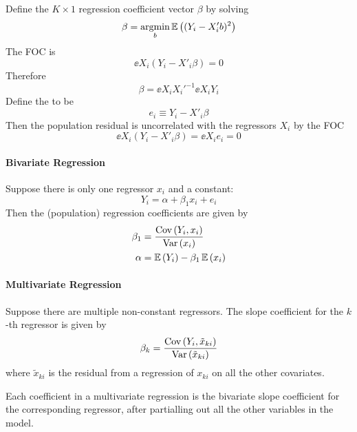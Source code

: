 \documentclass[11pt]{article}
\begin{document}
Define the $K \times 1$ regression coefficient vector $\beta$ by solving
\begin{equation}
	\beta = \argmin_{b} \ee{(Y_i - X'_i b)^2}
\end{equation}
The FOC is
\begin{equation}
	\ee{X_i(Y_i - X'_i \beta)} = 0
\end{equation}
Therefore 
\begin{equation}
	\beta = \ee{X_i X_i'}^{-1} \ee{X_i Y_i}
\end{equation}
Define the  to be
\begin{equation}
	e_i \equiv Y_i - X'_i \beta
\end{equation}
Then the population residual is uncorrelated with the regressors $X_i$ by the FOC
\begin{equation}
	\ee{X_i(Y_i - X'_i \beta)} = \ee{X_i e_i}= 0
\end{equation}

\paragraph{Bivariate Regression}

Suppose there is only one regressor $x_i$ and a constant:
\begin{equation}
	Y_i = \alpha + \beta_1 x_i + e_i
\end{equation}
Then the (population) regression coefficients are given by
\begin{align}
	\beta_1 &= \frac{\text{Cov}\left( Y_i,x_i \right)}{\text{Var}\left( x_i \right)} \\
	\alpha &= \mathop{{}\mathbb{E}}\left( Y_i \right) - \beta_1 \mathop{{}\mathbb{E}}\left( x_i \right)
\end{align}

\paragraph{Multivariate Regression}

Suppose there are multiple non-constant regressors. The slope coefficient for the $k$-th regressor is given by
\begin{equation}
	\beta_k = \frac{\text{Cov}\left( Y_i,\tilde{x}_{ki} \right)}{\text{Var}\left( \tilde{x}_{ki} \right)}
\end{equation}
where $\tilde{x}_{ki}$ is the residual from a regression of $x_{ki}$ on all the other covariates.

\begin{interpretation}
	Each coefficient in a multivariate regression is the bivariate slope coefficient for the corresponding regressor, after partialling out all the other variables in the model.
\end{interpretation}
\end{document}
